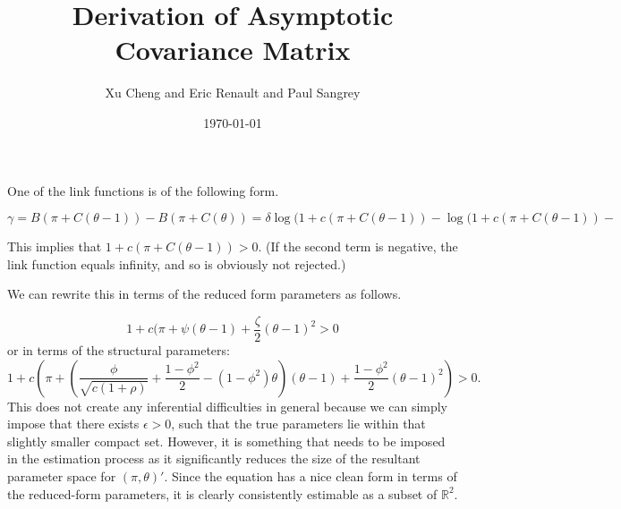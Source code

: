 \documentclass[11pt, letterpaper, twoside, final]{article}
\author{Xu Cheng and Eric Renault and Paul Sangrey}
\title{Derivation of Asymptotic Covariance Matrix}
\date{\today}
\begin{document}
\maketitle

One of the link functions is of the following form. 

\begin{equation}   
    \gamma = B(\pi + C(\theta-1)) - B(\pi + C(\theta)) 
           = \delta \log(1 + c (\pi + C(\theta-1)) - \log(1 + c (\pi + C(\theta-1)) - 
\end{equation}


This implies that $1 + c(\pi + C(\theta-1)) > 0$.
(If the second term is negative, the link function equals infinity, and so is obviously not rejected.)


We can rewrite this in terms of the reduced form parameters as follows.

\begin{equation}
    1 + c (\pi + \psi (\theta-1) + \frac{\zeta}{2} (\theta-1)^2 > 0
\end{equation}
%
or in terms of the structural parameters:
%
\begin{equation}
    \label{eqn:constraint}
    1 + c\left(\pi + \left(\frac{\phi}{\sqrt{c(1+\rho)}} + \frac{1-\phi^2}{2} - (1 -\phi^2)\theta\right)(\theta-1)
    + \frac{1-\phi^2}{2} (\theta-1)^2\right) > 0.
\end{equation}
%
This does not create any inferential difficulties in general because we can simply impose that there exists
$\epsilon > 0$, such that the true parameters lie within that slightly smaller compact set.
However, it is something that needs to be imposed in the estimation process as it significantly reduces the size
of the resultant parameter space for $(\pi, \theta)'$.
Since the equation has a nice clean form in terms of the reduced-form parameters, it is clearly consistently
estimable as a subset of $\mathbb{R}^2$.
\end{document}
